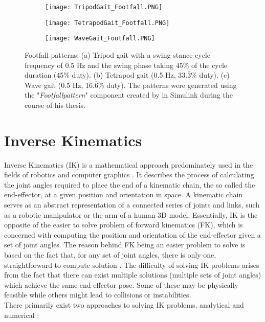 \begin{figure}[h]
	\begin{subfigure}{\textwidth} %
		\centering
		\texttt{[image: TripodGait\_Footfall.PNG]}  %
		\caption{}
		\label{figure: tripod footfall}
	\end{subfigure}
	
	\begin{subfigure}{\textwidth}
		\centering
		\texttt{[image: TetrapodGait\_Footfall.PNG]}  
		\caption{}
		\label{figure: tetrapod footfall}
	\end{subfigure}
	
	\begin{subfigure}{\textwidth}
		\centering
		\texttt{[image: WaveGait\_Footfall.PNG]}   %
		\caption{}
		\label{figure: wave footfall}
	\end{subfigure}
	\caption[Footfall Patterns]{Footfall patterns: (a) Tripod gait with a swing-stance cycle frequency of 0.5 Hz and the swing phase taking 45\% of the cycle duration (45\% duty). (b) Tetrapod gait (0.5 Hz, 33.$\overline{3}$\% duty). (c) Wave gait (0.5 Hz, 16.$\overline{6}$\% duty). The patterns were generated using the "\textit{Footfallpattern}" component created by \cite{sanandoHexapod} in Simulink during the course of his thesis.}
	\label{figure: Footfall patterns}
\end{figure}


\section{Inverse Kinematics}
Inverse Kinematics (IK) is a mathematical approach predominately used in the fields of robotics and computer graphics \parencite{AristidouFABRIK}.
It describes the process of calculating the joint angles required to place the end of a kinematic chain, the so called the end-effector, at a given position and orientation in space.
A kinematic chain serves as an abstract representation of a connected series of joints and links, such as a robotic manipulator or the arm of a human 3D model.
Essentially, IK is the opposite of the easier to solve problem of forward kinematics (FK), which is concerned with computing the position and orientation of the end-effector given a set of joint angles.
The reason behind FK being an easier problem to solve is based on the fact that, for any set of joint angles, there is only one, straightforward to compute solution \parencite{inverseKinematicsIllinois}.
The difficulty of solving IK problems arises from the fact that there can exist multiple solutions (multiple sets of joint angles) which achieve the same end-effector pose.
Some of these may be physically feasible while others might lead to collisions or instabilities.\\
There primarily exist two approaches to solving IK problems, analytical and numerical \parencite{inverseKinematicsIllinois}:

